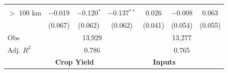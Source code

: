 \documentclass[12pt]{article}
\begin{document}
\begin{table}
\begin{threeparttable}[t]
\begin{tabular}{lcccccc}
              &          &                 &                 &              &             &              \\
$>$ 100 km    & $-$0.019 & $-$0.120$^{*}$  & $-$0.137$^{**}$ & 0.026        & $-$0.008    &  0.063       \\
              & (0.067)  & (0.062)         & (0.062)         & (0.041)      & (0.054)     &  (0.055)     \\
         [1em]
         \hline
         Obs      &   \multicolumn{3}{c}{13,929}  &   \multicolumn{3}{c}{13,277} \\
         Adj. $R^2$ &  \multicolumn{3}{c}{0.786} &\multicolumn{3}{c}{0.765}  \\

\hline\hline
 &\multicolumn{2}{c}{\textbf{Crop Yield}} & \multicolumn{4}{c}{\textbf{Inputs}} \\
[.5em]


\end{tabular}
\end{threeparttable}
\end{table}
\end{document}
